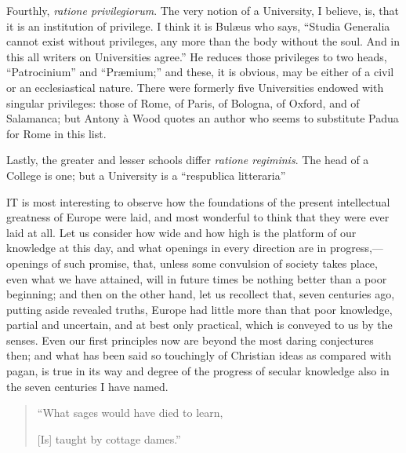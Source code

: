 Fourthly, \emph{ratione
privilegiorum}. The very notion of a University, I believe, is,
that it is an institution of privilege. I think it is Bulæus who
says, ``Studia Generalia cannot exist without privileges, any more
than the body without the soul. And in this all writers on
Universities agree.'' He reduces those privileges to two heads, ``Patrocinium'' and
``Præmium;'' and these, it is obvious, may be
either of a civil or an ecclesiastical nature. There were formerly
five Universities endowed with singular privileges: those of Rome, of
Paris, of Bologna, of Oxford, and of Salamanca; but Antony à Wood
quotes an author who seems to substitute Padua for Rome in this list.

Lastly, the greater and lesser
schools differ \emph{ratione regiminis}. The head of a College is one;
but a University is a ``respublica litteraria''


IT
is most interesting to observe how the foundations of the present
intellectual greatness of Europe were laid, and most wonderful to
think that they were ever laid at all. Let us consider how wide and
how high is the platform of our knowledge at this day, and what
openings in every direction are in progress,—openings of such
promise, that, unless some convulsion of society takes place, even
what we have attained, will in future times be nothing better than a
poor beginning; and then on the other hand, let us recollect that,
seven centuries ago, putting aside revealed truths, Europe had little
more than that poor knowledge, partial and uncertain, and at best only
practical, which is conveyed to us by the senses. Even our first
principles now are beyond the most daring conjectures then; and what
has been said so touchingly of Christian ideas as compared with pagan,
is true in its way and degree of the progress of secular knowledge
also in the seven centuries I have named.

\begin{quote}

``What sages would have
died to learn,

[Is] taught by cottage dames.''

\end{quote}

